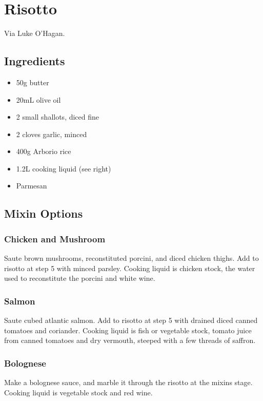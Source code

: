 \section{Risotto}


Via Luke O'Hagan.

\begin{multicols}{2}
  \subsection{Ingredients}
    \begin{itemize}
      \item 50g butter
      \item 20mL olive oil
      \item 2 small shallots, diced fine
      \item 2 cloves garlic, minced
      \item 400g Arborio rice
      \item 1.2L cooking liquid (see right)
      \item Parmesan
    \end{itemize}
  \subsection{Mixin Options}
    \subsubsection{Chicken and Mushroom}
      Saute brown mushrooms, reconstituted porcini, and diced chicken thighs. Add to risotto at step 5 with minced parsley. Cooking liquid is chicken stock, the water used to reconstitute the porcini and white wine.
    \subsubsection{Salmon}
      Saute cubed atlantic salmon. Add to risotto at step 5 with drained diced canned tomatoes and coriander. Cooking liquid is fish or vegetable stock, tomato juice from canned tomatoes and dry vermouth, steeped with a few threads of saffron.
    \subsubsection{Bolognese}
      Make a bolognese sauce, and marble it through the risotto at the mixins stage. Cooking liquid is vegetable stock and red wine.

\end{multicols}
